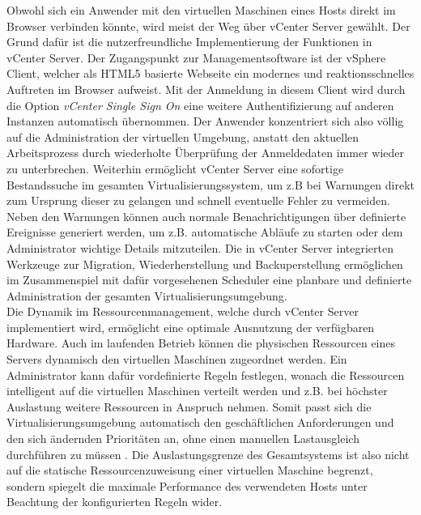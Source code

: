Obwohl sich ein Anwender mit den virtuellen Maschinen eines Hosts direkt im Browser verbinden könnte, wird meist der Weg über vCenter Server gewählt. Der Grund dafür ist die nutzerfreundliche Implementierung der Funktionen in vCenter Server. Der Zugangspunkt zur Managementsoftware ist der vSphere Client, welcher als HTML5 basierte Webseite ein modernes und reaktionsschnelles Auftreten im Browser aufweist. Mit der Anmeldung in diesem Client wird durch die Option \textit{vCenter Single Sign On} eine weitere Authentifizierung auf anderen Instanzen automatisch übernommen. Der Anwender konzentriert sich also völlig auf die Administration der virtuellen Umgebung, anstatt den aktuellen Arbeitsprozess durch wiederholte Überprüfung der Anmeldedaten immer wieder zu unterbrechen. Weiterhin ermöglicht vCenter Server eine sofortige Bestandssuche im gesamten Virtualisierungssystem, um z.B bei Warnungen direkt zum Ursprung dieser zu gelangen und schnell eventuelle Fehler zu vermeiden. Neben den Warnungen können auch normale Benachrichtigungen über definierte Ereignisse generiert werden, um z.B. automatische Abläufe zu starten oder dem Administrator wichtige Details mitzuteilen. Die in vCenter Server integrierten Werkzeuge zur Migration, Wiederherstellung und Backuperstellung ermöglichen im Zusammenspiel mit dafür vorgesehenen Scheduler eine planbare und definierte Administration der gesamten Virtualisierungsumgebung.~\cite[S.~2]{VMware2018}\medskip\\
Die Dynamik im Ressourcenmanagement, welche durch vCenter Server implementiert wird, ermöglicht eine optimale Ausnutzung der verfügbaren Hardware. Auch im laufenden Betrieb können die physischen Ressourcen eines Servers dynamisch den virtuellen Maschinen zugeordnet werden.
Ein Administrator kann dafür vordefinierte Regeln festlegen, wonach die Ressourcen intelligent auf die virtuellen Maschinen verteilt werden und z.B. bei höchster Auslastung weitere Ressourcen in Anspruch nehmen. Somit passt sich die Virtualisierungsumgebung automatisch den geschäftlichen Anforderungen und den sich ändernden Prioritäten an, ohne einen manuellen Lastausgleich durchführen zu müssen \cite[S.~3]{VMware2018}.
Die Auslastungsgrenze des Gesamtsystems ist also nicht auf die statische Ressourcenzuweisung einer virtuellen Maschine begrenzt, sondern spiegelt die maximale Performance des verwendeten Hosts unter Beachtung der konfigurierten Regeln wider.

